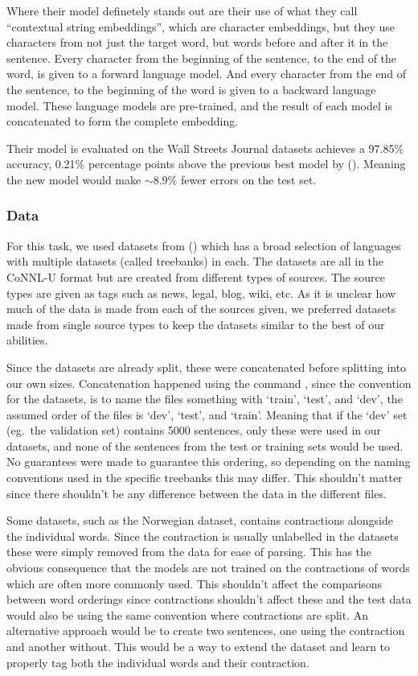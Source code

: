 Where their model definetely stands out are their use of what they call
``contextual string embeddings'', which are character embeddings, but they use
characters from not just the target word, but words before and after it in the
sentence. Every character from the beginning of the sentence, to the end of the
word, is given to a forward language model. And every character from the end of
the sentence, to the beginning of the word is given to a backward language
model. These language models are pre-trained, and the result of each model is
concatenated to form the complete embedding. 

Their model is evaluated on the Wall Streets Journal datasets achieves a 97.85\%
accuracy, 0.21\% percentage points above the previous best model by
(\cite{choi2016dynamic}). Meaning the new model would make $\sim8.9\%$ fewer
errors on the test set.

\subsubsection{Data}\label{sec:experiments-pos-data}

For this task, we used datasets from (\cite{universaldependencies}) which has a
broad selection of languages with multiple datasets (called treebanks) in each.
The datasets are all in the CoNNL-U format but are created from different types
of sources. The source types are given as tags such as news, legal, blog, wiki,
etc. As it is unclear how much of the data is made from each of the sources
given, we preferred datasets made from single source types to keep the datasets
similar to the best of our abilities.

Since the datasets are already split, these were concatenated before splitting
into our own sizes. Concatenation happened using the command , since the convention for the datasets, is to name the files
something with `train', `test', and `dev', the assumed order of the files is `dev',
`test', and `train'. Meaning that if the `dev' set (eg.\ the validation set) contains
5000 sentences, only these were used in our datasets, and none of the sentences
from the test or training sets would be used. No guarantees were made to
guarantee this ordering, so depending on the naming conventions used in the
specific treebanks this may differ. This shouldn't matter since there shouldn't
be any difference between the data in the different files.

Some datasets, such as the Norwegian dataset, contains contractions alongside
the individual words. Since the contraction is usually unlabelled in the datasets
these were simply removed from the data for ease of parsing. This has the
obvious consequence that the models are not trained on the contractions of words
which are often more commonly used. This shouldn't affect the comparisons
between word orderings since contractions shouldn't affect these and the test
data would also be using the same convention where contractions are split. An
alternative approach would be to create two sentences, one using the contraction
and another without. This would be a way to extend the dataset and learn to
properly tag both the individual words and their contraction.

